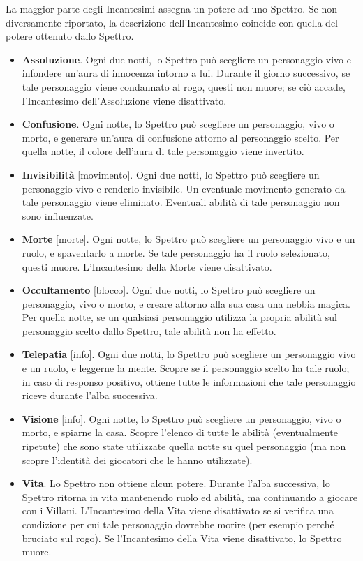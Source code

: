 \documentclass[a4paper,10pt]{article}
\begin{document}
La maggior parte degli Incantesimi assegna un potere ad uno Spettro. Se non diversamente riportato, la descrizione dell'Incantesimo coincide con quella del potere ottenuto dallo Spettro.

\begin{itemize}

    \item {\bf Assoluzione}. Ogni due notti, lo Spettro può scegliere un personaggio vivo e infondere un'aura di innocenza intorno a lui. Durante il giorno successivo, se tale personaggio viene condannato al rogo, questi non muore; se ciò accade, l'Incantesimo dell'Assoluzione viene disattivato.

    \item {\bf Confusione}. Ogni notte, lo Spettro può scegliere un personaggio, vivo o morto, e generare un'aura di confusione attorno al personaggio scelto. Per quella notte, il colore dell'aura di tale personaggio viene invertito.

    \item {\bf Invisibilità} [movimento]. Ogni due notti, lo Spettro può scegliere un personaggio vivo e renderlo invisibile. Un eventuale movimento generato da tale personaggio viene eliminato. Eventuali abilità di tale personaggio non sono influenzate.

    \item {\bf Morte} [morte]. Ogni notte, lo Spettro può scegliere un personaggio vivo e un ruolo, e spaventarlo a morte. Se tale personaggio ha il ruolo selezionato, questi muore. L'Incantesimo della Morte viene disattivato.

    \item {\bf Occultamento} [blocco]. Ogni due notti, lo Spettro può scegliere un personaggio, vivo o morto, e creare attorno alla sua casa una nebbia magica. Per quella notte, se un qualsiasi personaggio utilizza la propria abilità sul personaggio scelto dallo Spettro, tale abilità non ha effetto.

    \item {\bf Telepatia} [info]. Ogni due notti, lo Spettro può scegliere un personaggio vivo e un ruolo, e leggerne la mente. Scopre se il personaggio scelto ha tale ruolo; in caso di responso positivo, ottiene tutte le informazioni che tale personaggio riceve durante l'alba successiva.

    \item {\bf Visione} [info]. Ogni notte, lo Spettro può scegliere un personaggio, vivo o morto, e spiarne la casa. Scopre l'elenco di tutte le abilità (eventualmente ripetute) che sono state utilizzate quella notte su quel personaggio (ma non scopre l'identità dei giocatori che le hanno utilizzate).

    \item {\bf Vita}. Lo Spettro non ottiene alcun potere. Durante l'alba successiva, lo Spettro ritorna in vita mantenendo ruolo ed abilità, ma continuando a giocare con i Villani. L'Incantesimo della Vita viene disattivato se si verifica una condizione per cui tale personaggio dovrebbe morire (per esempio perché bruciato sul rogo). Se l'Incantesimo della Vita viene disattivato, lo Spettro muore.

\end{itemize}
\end{document}
